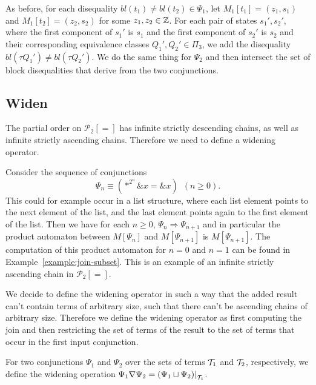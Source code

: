 As before, for each disequality $bl(t_1) \neq bl(t_2) \in \Psi_1$, let $M_1[t_1] = (z_1, s_1)$ and $M_1[t_2] = (z_2, s_2)$ for some $z_1,z_2\in \mathbb{Z}$.
For each pair of states $s_1', s_2'$, where the first component of $s_1'$ is $s_1$ and the first component of $s_2'$ is $s_2$ and their corresponding equivalence classes $Q_1', Q_2' \in \Pi_3$, we add the disequality $bl(\tau Q_1') \neq bl(\tau Q_2')$.
We do the same thing for $\Psi_2$ and then intersect the set of block disequalities that derive from the two conjunctions.

\subsection{Widen}

The partial order on $\mathcal{P}_2[=]$ has infinite strictly descending chains, as well as
infinite strictly ascending chains. Therefore we need to define a widening operator.

\begin{example}
    Consider the sequence of conjunctions
    \[
        \Psi_n \equiv (*^{2^n} \&x = \&x)\hspace{6pt} (n\geq 0).
    \]
   This could for example occur in a list structure, where each list element points to the next element of the list, and the last element points again to the first element of the list.
   Then we have for each $n \geq 0$, $\Psi_n \Longrightarrow \Psi_{n+1}$ and in particular the product automaton between $M[\Psi_n]$ and $M[\Psi_{n+1}]$ is $M[\Psi_{n+1}]$.
   The computation of this product automaton for $n = 0$ and $n = 1$ can be found in Example~\ref{example:join-subset}. This is an example of an infinite strictly ascending chain in $\mathcal{P}_2[=]$.
\end{example}

We decide to define the widening operator in such a way that the added result can't contain terms of arbitrary size, such that there can't be ascending chains of arbitrary size. Therefore we define the widening operator as first computing the join and then restricting the set of terms of the result to the set of terms that occur in the first input conjunction.

\begin{definition}
    For two conjunctions $\Psi_1$ and $\Psi_2$ over the sets of terms $\mathcal{T}_1$ and $\mathcal{T}_2$, respectively, we define the widening operation
     $\Psi_1 \widen \Psi_2 = \restr{(\Psi_1 \join \Psi_2)}{\T_1}$.
\end{definition}

